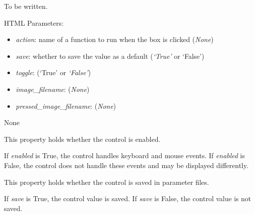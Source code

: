 \documentclass[letterpaper,10pt,english]{sphinxmanual}
\begin{document}
\begin{fulllineitems}
\label{api:controls.ImageButton}
To be written.

HTML Parameters:
\begin{itemize}
\item {} 
\emph{action}: name of a function to run when the box is clicked (\emph{None})

\item {} 
\emph{save}: whether to save the value as a default (\emph{`True'} or `False')

\item {} 
\emph{toggle}: (`True' or \emph{`False'})

\item {} 
\emph{image\_filename}: (\emph{None})

\item {} 
\emph{pressed\_image\_filename}: (\emph{None})

\end{itemize}

\begin{fulllineitems}
\label{api:controls.ImageButton.action}
None

\end{fulllineitems}


\begin{fulllineitems}
\label{api:controls.ImageButton.enabled}
This property holds whether the control is enabled.

If \emph{enabled} is True, the control handles keyboard and mouse events.
If \emph{enabled} is False, the control does not handle these events and may
be displayed differently.

\end{fulllineitems}


\begin{fulllineitems}
\label{api:controls.ImageButton.save}
This property holds whether the control is saved in parameter files.

If \emph{save} is True, the control value is saved.
If \emph{save} is False, the control value is not saved.


\end{fulllineitems}
\end{fulllineitems}
\end{document}

